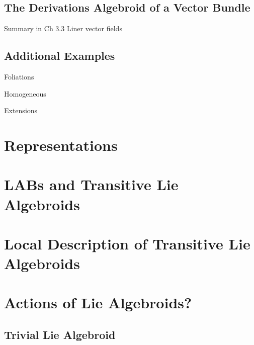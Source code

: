 \subsection{The Derivations Algebroid of a Vector Bundle}

Summary in Ch 3.3 Liner vector fields

\subsection{Additional Examples}

Foliations

Homogeneous

Extensions

\section{Representations}

\section{LABs and Transitive Lie Algebroids}

\section{Local Description of Transitive Lie Algebroids}

\section{Actions of Lie Algebroids?}\subsection{Trivial Lie Algebroid}
